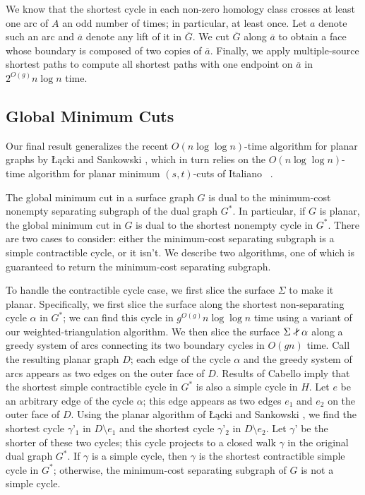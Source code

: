 \documentclass[natbib]{svcyclop}
\def\snip{\mathbin{\raisebox{0.15ex}{\rotatebox[origin=c]{60}{\Rightscissors}\!}}}
\def\snip{\mathbin{\raisebox{0.15ex}{\rotatebox[origin=c]{60}{\Rightscissors}\!}}}
\begin{document}
We know that the shortest cycle in each non-zero homology class crosses at least one arc of $A$ an odd number of times; in particular, at least once.
Let $a$ denote such an arc and $\overline{a}$ denote any lift of it in $\overline{G}$.  We cut $\overline{G}$ along $\overline{a}$ to obtain a face whose boundary is composed of two copies of $\overline{a}$.
Finally, we apply multiple-source shortest paths \cite{cce-msspe-13} to compute all shortest paths with one endpoint on $\overline{a}$ in $2^{O(g)}n\log n$ time.

\subsection{Global Minimum Cuts}

Our final result generalizes the recent $O(n\log \log n)$-time algorithm for planar graphs by Łącki and Sankowski \cite{ls-mcsc-11}, which in turn relies on the $O(n\log\log n)$-time algorithm for planar minimum $(s,t)$-cuts of Italiano \etal\ \cite{insw-iamcmf-11}.

The global minimum cut in a surface graph $G$ is dual to the minimum-cost nonempty separating subgraph of the dual graph $G^*$.  In particular, if $G$ is planar, the global minimum cut in $G$ is dual to the shortest nonempty cycle in $G^*$.
There are two cases to consider: either the minimum-cost separating subgraph is a simple contractible cycle, or it isn’t.  We describe two algorithms, one of which is guaranteed to return the minimum-cost separating subgraph.


To handle the contractible cycle case, we first slice the surface $\Sigma$ to make it planar.  Specifically, we first slice the surface along the shortest non-separating cycle $\alpha$ in $G^*$; we can find this cycle in $g^{O(g)}n\log\log n$ time using a variant of our weighted-triangulation algorithm.  We then slice the surface $\Sigma\snip\alpha$  along a greedy system of arcs connecting its two boundary cycles in $O(gn)$ time.  Call the resulting planar graph $D$; each edge of the cycle $\alpha$ and the greedy system of arcs appears as two edges on the outer face of $D$.  Results of Cabello \cite{c-fscss-10} imply that the shortest simple contractible cycle in  $G^*$ is also a simple cycle in $H$.  Let $e$ be an arbitrary edge of the cycle $\alpha$; this edge appears as two edges $e_1$ and $e_2$ on the outer face of $D$.  Using the planar algorithm of Łącki and Sankowski \cite{ls-mcsc-11}, we find the shortest cycle $\gamma’_1$ in  $D\setminus e_1$ and the shortest cycle $\gamma’_2$ in $D\setminus e_2$.  Let $\gamma’$ be the shorter of these two cycles; this cycle projects to a closed walk $\gamma$ in the original dual graph $G^*$.  If $\gamma$ is a simple cycle, then $\gamma$ is the shortest contractible simple cycle in $G^*$; otherwise,  the minimum-cost separating subgraph of $G$ is not a simple cycle.
\end{document}
